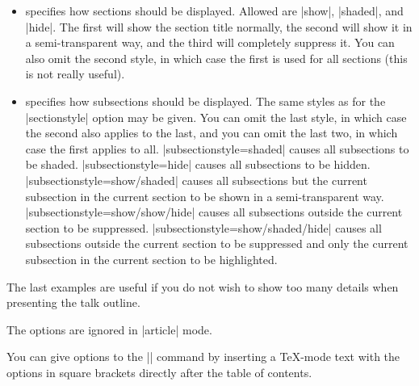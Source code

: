 \begin{command}{\tableofcontents{}}
\begin{itemize}
    sections mentioned in the  to be
    shown. For example, \verb/sections={<2-4| handout:0>}/ causes only the second,
    third, and fourth section to be shown in the normal version,
    nothing to be shown in the handout version, and everything to be
    shown in all other versions. For convenience, if you omit the
    pointed brackets, the specification is assumed to apply to all
    versions. Thus |sections={2-4}| causes sections two, three, and
    four to be shown in all versions.
  \item
     specifies how
    sections should be displayed. Allowed  are |show|,
    |shaded|, and |hide|. The first will show the section title
    normally, the second will show it in a semi-transparent way, and
    the third will completely suppress it. You can
    also omit the second style, in which case the first is used for
    all sections (this is not really useful).
  \item
    specifies how subsections should be displayed. The same styles as
    for the |sectionstyle| option may be given. You can omit the last
    style, in which case the second also applies to the last, and you can
    omit the last two, in which case the first applies to all.
    \example |subsectionstyle=shaded| causes all subsections to be
    shaded.
    \example |subsectionstyle=hide| causes all subsections to be
    hidden.
    \example |subsectionstyle=show/shaded| causes all subsections but the
    current subsection in the current section to be shown in a
    semi-transparent way.
    \example |subsectionstyle=show/show/hide| causes all
    subsections outside the current section to be suppressed.
    \example |subsectionstyle=show/shaded/hide| causes all
    subsections outside the current section to be suppressed and only
    the current subsection in the current section to be highlighted.
  \end{itemize}
  The last examples are useful if you do not wish to show
  too many details when presenting the talk outline.

  \articlenote
  The options are ignored in |article| mode.

  \lyxnote
  You can give options to the |\tableofcontents| command by
  inserting a \TeX-mode text with the options in square brackets
  directly after the table of contents.


\end{command}
